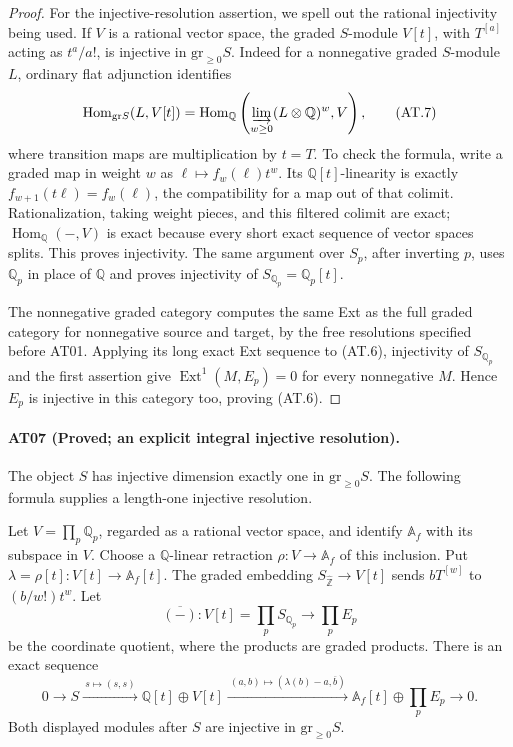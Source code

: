 \begin{proof}
For the injective-resolution assertion, we spell out
the rational injectivity being used. If $V$ is a rational
vector space, the graded $S$-module $V[t]$, with
$T^{[a]}$ acting as $t^a/a!$, is injective in
$\mathrm{gr}_{\geq0}S$. Indeed for a nonnegative graded
$S$-module $L$, ordinary flat adjunction identifies
\[
 \operatorname{Hom}_{\mathrm{gr}S}(L,V[t])
 =\operatorname{Hom}_{\mathbb Q}
 \left(\varinjlim_{w\geq0}(L\otimes\mathbb Q)^w,V\right),
 \tag{AT.7}
\]
where transition maps are multiplication by $t=T$.
To check the formula, write a graded map in weight $w$
as $\ell\mapsto f_w(\ell)t^w$. Its $\mathbb Q[t]$-linearity
is exactly $f_{w+1}(t\ell)=f_w(\ell)$, the compatibility
for a map out of that colimit. Rationalization, taking
weight pieces, and this filtered colimit are exact;
$\operatorname{Hom}_{\mathbb Q}(-,V)$ is exact because
every short exact sequence of vector spaces splits.
This proves injectivity. The same argument over
$S_p$, after inverting $p$, uses $\mathbb Q_p$ in
place of $\mathbb Q$ and proves injectivity of
$S_{\mathbb Q_p}=\mathbb Q_p[t]$.

The nonnegative graded category computes the same Ext
as the full graded category for nonnegative source and
target, by the free resolutions specified before AT01.
Applying its long exact Ext sequence to (AT.6),
injectivity of $S_{\mathbb Q_p}$ and the first assertion
give $\operatorname{Ext}^1(M,E_p)=0$ for every
nonnegative $M$. Hence $E_p$ is injective in this
category too, proving (AT.6).
\end{proof}

\paragraph{AT07 (Proved; an explicit integral injective resolution).}
The object $S$ has injective dimension exactly one in
$\mathrm{gr}_{\geq0}S$. The following formula supplies
a length-one injective resolution.

Let $V=\prod_p\mathbb Q_p$, regarded as a rational
vector space, and identify $\mathbb A_f$ with its
subspace in $V$. Choose a $\mathbb Q$-linear retraction
$\rho:V\to\mathbb A_f$ of this inclusion. Put
$\lambda=\rho[t]:V[t]\to\mathbb A_f[t]$.
The graded embedding
$S_{\widehat{\mathbb Z}}\to V[t]$ sends
$bT^{[w]}$ to $(b/w!)t^w$.
Let
\[
 \overline{(-)}:V[t]=\prod_p S_{\mathbb Q_p}
       \longrightarrow\prod_p E_p
\]
be the coordinate quotient, where the products are graded
products. There is an exact sequence
\[
 0\longrightarrow S
 \xrightarrow{\ s\mapsto(s,s)\ }
 \mathbb Q[t]\oplus V[t]
 \xrightarrow{\ (a,b)\mapsto(\lambda(b)-a,\overline b)\ }
 \mathbb A_f[t]\oplus\prod_p E_p
 \longrightarrow0 .
 \tag{AT.8}
\]
Both displayed modules after $S$ are injective in
$\mathrm{gr}_{\geq0}S$.

